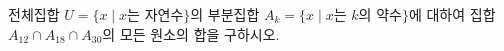 전체집합 $U=\{x \mid x$는 자연수$\}$의 부분집합 $A_k=\{x \mid x$는 $k$의 약수$\}$에 대하여 집합 $A_{12}\cap A_{18}\cap A_{30}$의 모든 원소의 합을 구하시오. 
